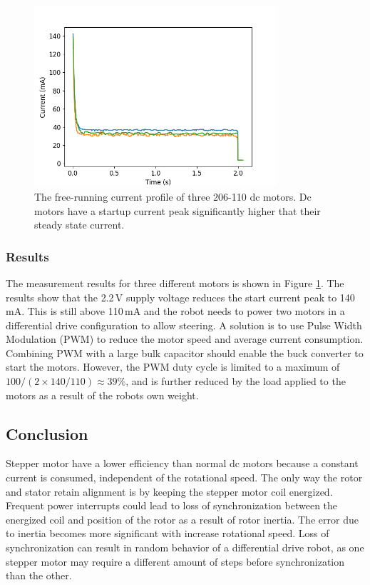 \begin{figure}%
	\centering
	\includegraphics[width=0.8\textwidth]{pics/free_running_current.png}
	\caption{The free-running current profile of three 206-110 dc motors. Dc motors have a startup current peak significantly higher that their steady state current.}
	\label{fig:free_running_current}
\end{figure}

\subsubsection{Results}
The measurement results for three different motors is shown in Figure \ref{fig:free_running_current}.
The results show that the 2.2\,V supply voltage reduces the start current peak to 140\,mA.
This is still above 110\,mA and the robot needs to power two motors in a differential drive configuration to allow steering.
A solution is to use Pulse Width Modulation (PWM) to reduce the motor speed and average current consumption.
Combining PWM with a large bulk capacitor should enable the buck converter to start the motors.
However, the PWM duty cycle is limited to a maximum of $100/(2\times140/110) \approx 39\%$, and is further reduced by the load applied to the motors as a result of the robots own weight.

\subsection{Conclusion}
Stepper motor have a lower efficiency than normal dc motors because a constant current is consumed, independent of the rotational speed.
The only way the rotor and stator retain alignment is by keeping the stepper motor coil energized.
Frequent power interrupts could lead to loss of synchronization between the energized coil and position of the rotor as a result of rotor inertia.
The error due to inertia becomes more significant with increase rotational speed.
Loss of synchronization can result in random behavior of a differential drive robot, as one stepper motor may require a different amount of steps before synchronization than the other.

